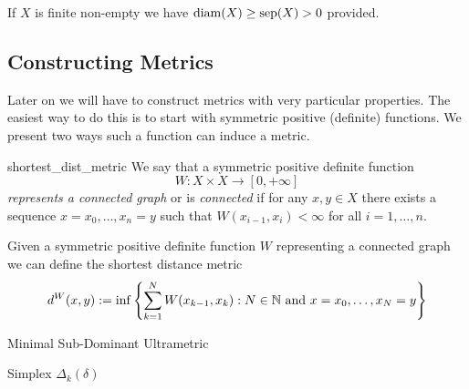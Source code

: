 If $X$ is finite non-empty we have $\mathrm{diam}(X) \geq \mathrm{sep}(X) > 0$ provided.

\subsection{Constructing Metrics}
Later on we will have to construct metrics with very particular properties. The easiest way to do this is to start with symmetric positive (definite) functions. We present two ways such a function can induce a metric.

\begin{definition}{}{shortest_dist_metric}
We say that a symmetric positive definite function
$$
W: X \times X \to [0, +\infty]
$$
\emph{represents a connected graph} or is \emph{connected} if for any $x,y \in X$ there exists a sequence $x = x_0, \dots, x_n = y$ such that $W(x_{i-1}, x_{i}) < \infty$ for all $i = 1, \dots, n$.
\end{definition}

\begin{definition}{}{}
Given a symmetric positive definite function $W$ representing a connected graph we can define the shortest distance metric
\begin{equation*}
    d^W(x,y) := \inf\left\{ \sum_{k = 1}^N W(x_{k-1}, x_k): N \in \mathbb N \text{ and } x = x_0, \dots, x_N = y\right\}
\end{equation*}
\end{definition}



\begin{defprop}{}{}

Minimal Sub-Dominant Ultrametric
\end{defprop}


\begin{definition}{Simplex $\Delta_k(\delta)$}{}
\end{definition}